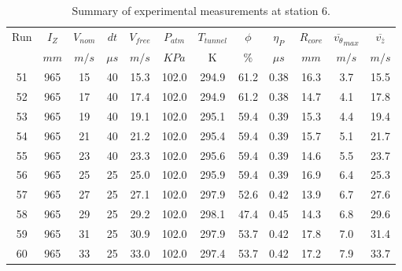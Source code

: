 \begin{table}[H]
\begin{center}
\begin{tabular}{|cccccccccccc|}
	\hline
	Run & $I_Z$ & $V_{nom}$ & $dt$ & $V_{free}$ & $P_{atm}$ & $T_{tunnel}$ & $\phi$ & $\eta_P$ & $R_{core}$ & $\overline{v_{\theta}}_{max}$ & $\overline{v_{\bar{z}}}$\\
	  & $mm$ & $m/s$ & $\mu s$ & $m/s$ & $KPa$ & K & $\%$ & $\mu s$ & $mm$ & $m/s$ & $m/s$\\
	\hline
	51 & 965 & 15 & 40 & 15.3 & 102.0 & 294.9 & 61.2 & 0.38 & 16.3 & 3.7 & 15.5\\
	52 & 965 & 17 & 40 & 17.4 & 102.0 & 294.9 & 61.2 & 0.38 & 14.7 & 4.1 & 17.8\\
	53 & 965 & 19 & 40 & 19.1 & 102.0 & 295.1 & 59.4 & 0.39 & 15.3 & 4.4 & 19.4\\
	54 & 965 & 21 & 40 & 21.2 & 102.0 & 295.4 & 59.4 & 0.39 & 15.7 & 5.1 & 21.7\\
	55 & 965 & 23 & 40 & 23.3 & 102.0 & 295.6 & 59.4 & 0.39 & 14.6 & 5.5 & 23.7\\
	56 & 965 & 25 & 25 & 25.0 & 102.0 & 295.9 & 59.4 & 0.39 & 16.9 & 6.4 & 25.3\\
	57 & 965 & 27 & 25 & 27.1 & 102.0 & 297.9 & 52.6 & 0.42 & 13.9 & 6.7 & 27.6\\
	58 & 965 & 29 & 25 & 29.2 & 102.0 & 298.1 & 47.4 & 0.45 & 14.3 & 6.8 & 29.6\\
	59 & 965 & 31 & 25 & 30.9 & 102.0 & 297.9 & 53.7 & 0.42 & 17.8 & 7.0 & 31.4\\
	60 & 965 & 33 & 25 & 33.0 & 102.0 & 297.4 & 53.7 & 0.42 & 17.2 & 7.9 & 33.7\\
	\hline
\end{tabular}
\caption{Summary of experimental measurements at station 6.}
\label{table:experiment_results_6}
\end{center}
\end{table}
